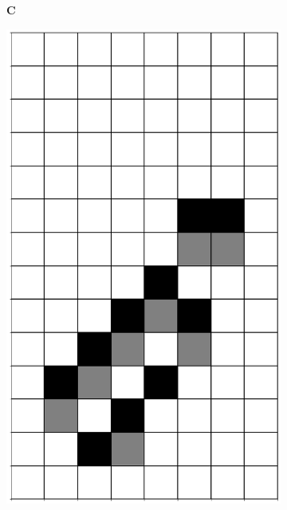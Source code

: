 \documentclass[12pt]{article}
\numberwithin{figure}{section} %
\begin{document}
\begin{figure}[H]
     	\begin{subfigure}[t]{0.03\textwidth}
    		\textbf{C}
  	\end{subfigure}	     
       	\begin{subfigure}{0.18\textwidth}
     		\centering
     		\includegraphics[width=\linewidth]{Section4/17.0}
     		\subcaption{}
  	\end{subfigure}
     	\begin{subfigure}{0.18\textwidth}
     		\centering

\end{subfigure}
\end{figure}
\end{document}
